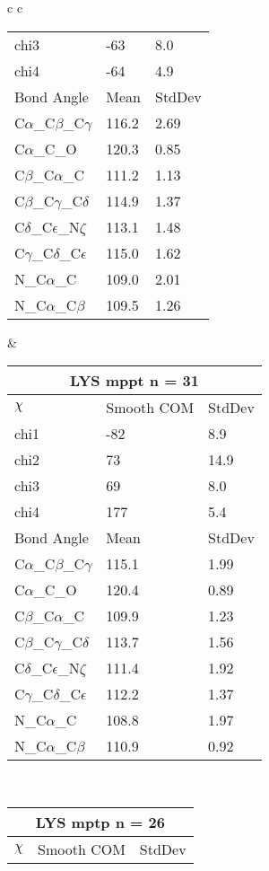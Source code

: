 \begin{longtable}{ c c }
\begin{tabular}{ l l l }
  chi3 & -63 & 8.0 \\ 
  chi4 & -64 & 4.9 \\ \midrule
  Bond Angle   & Mean     & StdDev \\ \midrule
  C$\alpha$\_C$\beta$\_C$\gamma$ & 116.2 & 2.69\\
  C$\alpha$\_C\_O & 120.3 & 0.85\\
  C$\beta$\_C$\alpha$\_C & 111.2 & 1.13\\
  C$\beta$\_C$\gamma$\_C$\delta$ & 114.9 & 1.37\\
  C$\delta$\_C$\epsilon$\_N$\zeta$ & 113.1 & 1.48\\
  C$\gamma$\_C$\delta$\_C$\epsilon$ & 115.0 & 1.62\\
  N\_C$\alpha$\_C & 109.0 & 2.01\\
  N\_C$\alpha$\_C$\beta$ & 109.5 & 1.26\\
  \bottomrule
  \end{tabular}
  &
  \begin{tabular}{ l l l }
  \toprule
  \multicolumn{3}{c}{LYS \textbf{mppt} n = 31} \\ \toprule
  $\chi$       & Smooth COM & StdDev \\ \midrule
  chi1 & -82 & 8.9 \\ 
  chi2 & 73 & 14.9 \\ 
  chi3 & 69 & 8.0 \\ 
  chi4 & 177 & 5.4 \\ \midrule
  Bond Angle   & Mean     & StdDev \\ \midrule
  C$\alpha$\_C$\beta$\_C$\gamma$ & 115.1 & 1.99\\
  C$\alpha$\_C\_O & 120.4 & 0.89\\
  C$\beta$\_C$\alpha$\_C & 109.9 & 1.23\\
  C$\beta$\_C$\gamma$\_C$\delta$ & 113.7 & 1.56\\
  C$\delta$\_C$\epsilon$\_N$\zeta$ & 111.4 & 1.92\\
  C$\gamma$\_C$\delta$\_C$\epsilon$ & 112.2 & 1.37\\
  N\_C$\alpha$\_C & 108.8 & 1.97\\
  N\_C$\alpha$\_C$\beta$ & 110.9 & 0.92\\
  \bottomrule
  \end{tabular}
  \\
  \begin{tabular}{ l l l }
  \toprule
  \multicolumn{3}{c}{LYS \textbf{mptp} n = 26} \\ \toprule
  $\chi$       & Smooth COM & StdDev \\ \midrule

\end{tabular}
\end{longtable}
